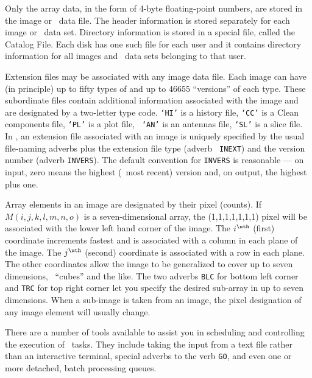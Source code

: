      Only the array data, in the form of 4-byte floating-point
numbers, are stored in the image or \uv\ data file.  The header
information is stored separately for each image or \uv\ data set.
Directory information is stored in a special file, called the Catalog
File.  Each disk has one such  file for each user and it contains
directory information for all images and \uv\ data sets belonging to
that user.

     Extension files may be associated with any image data file.  Each
image can have (in principle) up to fifty types of  and up to 46655 ``versions'' of each type.  These subordinate
files contain additional information associated with the image and are
designated by a two-letter type code.  {\tt `HI'} is a history file,
{\tt `CC'} is a Clean components file, {\tt `PL'} is a plot file, {\tt
`AN'} is an antennas file, {\tt `SL'} is a slice file.  In \AIPS, an
extension file associated with an image is uniquely specified by the
usual file-naming adverbs plus the extension file type (adverb {\tt
INEXT}) and the version number (adverb {\tt \hbox{INVERS}}).  The
default convention for {\tt INVERS} is reasonable --- on input, zero
means the highest (\ie\ most recent) version and, on output, the
highest plus one.

     Array elements in an image are designated by their pixel
 (counts).  If $M(i,j,k,l,m,n,o)$ is a
seven-dimensional array, the (1,1,1,1,1,1,1) pixel will be associated
with the lower left hand corner of the image.  The $i^{\uth}$ (first)
coordinate increments fastest and is associated with a column in each
plane of the image.  The $j^{\uth}$ (second) coordinate is associated
with a row in each plane.  The other coordinates allow the image to be
generalized to cover up to seven dimensions, \ie\ ``cubes'' and the
like.  The two adverbs {\tt BLC} for bottom left corner and {\tt TRC}
for top right corner let you specify the desired sub-array in up to
seven dimensions.  When a sub-image is taken from an image, the
pixel designation of any image element will usually change.


     There are a number of tools available to assist you in scheduling
and controlling the execution of \AIPS\ tasks.  They include taking
the input from a text file rather than an interactive terminal,
special adverbs to the verb {\tt GO}, and even one or more detached,
batch processing queues.



